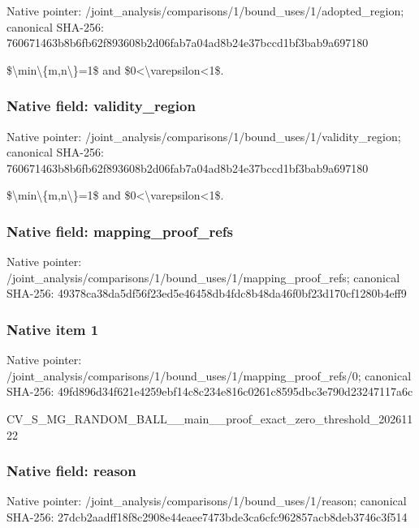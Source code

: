 \documentclass[10pt,a4paper]{article}
\begin{document}
Native pointer: /joint\_analysis/comparis\allowbreak{}ons/1/bound\_uses/1/adopt\allowbreak{}ed\_region; canonical SHA-256: 760671463b8b6fb62f893608\allowbreak{}b2d06fab7a04ad8b24e37bcc\allowbreak{}d1bf3bab9a697180


\$\textbackslash{}min\textbackslash{}\{m,n\textbackslash{}\}=1\$ and \$0<\textbackslash{}varepsilon<1\$.


\subsubsection{Native field: validity\_region}


Native pointer: /joint\_analysis/comparis\allowbreak{}ons/1/bound\_uses/1/valid\allowbreak{}ity\_region; canonical SHA-256: 760671463b8b6fb62f893608\allowbreak{}b2d06fab7a04ad8b24e37bcc\allowbreak{}d1bf3bab9a697180


\$\textbackslash{}min\textbackslash{}\{m,n\textbackslash{}\}=1\$ and \$0<\textbackslash{}varepsilon<1\$.


\subsubsection{Native field: mapping\_proof\_refs}


Native pointer: /joint\_analysis/comparis\allowbreak{}ons/1/bound\_uses/1/mappi\allowbreak{}ng\_proof\_refs; canonical SHA-256: 49378ca38da5df56f23ed5e4\allowbreak{}6458db4fdc8b48da46f0bf23\allowbreak{}d170cf1280b4eff9



\subsubsection{Native item 1}


Native pointer: /joint\_analysis/comparis\allowbreak{}ons/1/bound\_uses/1/mappi\allowbreak{}ng\_proof\_refs/0; canonical SHA-256: 49fd896d34f621e4259ebf14\allowbreak{}c8c234e816c0261c8595dbc3\allowbreak{}e790d23247117a6c


CV\_S\_MG\_RANDOM\_BALL\_\_mai\allowbreak{}n\_\_proof\_exact\_zero\_thre\allowbreak{}shold\_20261122


\subsubsection{Native field: reason}


Native pointer: /joint\_analysis/comparis\allowbreak{}ons/1/bound\_uses/1/reaso\allowbreak{}n; canonical SHA-256: 27dcb2aadff18f8c2908e44e\allowbreak{}aee7473bde3ca6cfc962857a\allowbreak{}cb8deb3746c3f514
\end{document}
